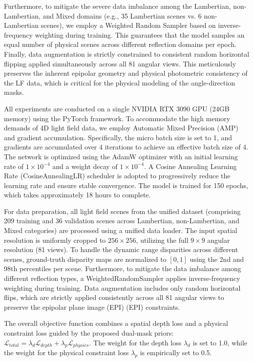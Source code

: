 \documentclass[lettersize,journal]{IEEEtran}
\begin{document}
Furthermore, to mitigate the severe data imbalance among the Lambertian, non-Lambertian, and Mixed domains (e.g., 35 Lambertian scenes vs. 6 non-Lambertian scenes), we employ a Weighted Random Sampler based on inverse-frequency weighting during training. This guarantees that the model samples an equal number of physical scenes across different reflection domains per epoch. Finally, data augmentation is strictly constrained to consistent random horizontal flipping applied simultaneously across all 81 angular views. This meticulously preserves the inherent epipolar geometry and physical photometric consistency of the LF data, which is critical for the physical modeling of the angle-direction masks.

All experiments are conducted on a single NVIDIA RTX 3090 GPU (24GB memory) using the PyTorch framework. To accommodate the high memory demands of 4D light field data, we employ Automatic Mixed Precision (AMP) and gradient accumulation. Specifically, the micro batch size is set to 1, and gradients are accumulated over 4 iterations to achieve an effective batch size of 4. The network is optimized using the AdamW optimizer with an initial learning rate of $1 \times 10^{-4}$ and a weight decay of $1 \times 10^{-4}$. A Cosine Annealing Learning Rate (CosineAnnealingLR) scheduler is adopted to progressively reduce the learning rate and ensure stable convergence. The model is trained for 150 epochs, which takes approximately 18 hours to complete.

For data preparation, all light field scenes from the unified dataset (comprising 209 training and 36 validation scenes across Lambertian, non-Lambertian, and Mixed categories) are processed using a unified data loader. The input spatial resolution is uniformly cropped to $256 \times 256$, utilizing the full $9 \times 9$ angular resolution (81 views). To handle the dynamic range disparities across different scenes, ground-truth disparity maps are normalized to $[0, 1]$ using the 2nd and 98th percentiles per scene. Furthermore, to mitigate the data imbalance among different reflection types, a WeightedRandomSampler applies inverse-frequency weighting during training. Data augmentation includes only random horizontal flips, which are strictly applied consistently across all 81 angular views to preserve the epipolar plane image (EPI) (EPI) constraints.

The overall objective function combines a spatial depth loss and a physical constraint loss guided by the proposed dual-mask priors: $\mathcal{L}_{total} = \lambda_{d} \mathcal{L}_{depth} + \lambda_{p} \mathcal{L}_{physics}$. The weight for the depth loss $\lambda_{d}$ is set to 1.0, while the weight for the physical constraint loss $\lambda_{p}$ is empirically set to 0.5.
\end{document}
